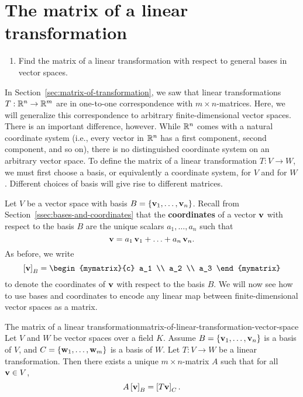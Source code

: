 \section{The matrix of a linear transformation}

\begin{outcome}
  \begin{enumerate}
  \item Find the matrix of a linear transformation with respect to
    general bases in vector spaces.
  \end{enumerate}
\end{outcome}

In Section~\ref{sec:matrix-of-transformation}, we saw that linear
transformations $T:\mathbb{R}^n\to\mathbb{R}^m$ are in one-to-one correspondence with
$m\times n$-matrices. Here, we will generalize this correspondence to
arbitrary finite-dimensional vector spaces. There is an important
difference, however. While $\mathbb{R}^n$ comes with a natural coordinate
system (i.e., every vector in $\mathbb{R}^n$ has a first component, second
component, and so on), there is no distinguished coordinate system on
an arbitrary vector space. To define the matrix of a linear
transformation $T:V\to W$, we must first choose a basis, or
equivalently a coordinate system, for $V$ and for $W$. Different
choices of basis will give rise to different matrices.

Let $V$ be a vector space with basis
$B=\set{\vect{v}_1,\ldots,\vect{v}_n}$. Recall from
Section~\ref{ssec:bases-and-coordinates} that the \textbf{coordinates}
of a vector $\vect{v}$ with respect to the basis $B$%
%
 are the unique scalars
$a_1,\ldots,a_n$ such that
\begin{equation*}
  \vect{v} = a_1\,\vect{v}_1 + \ldots + a_n\,\vect{v}_n.
\end{equation*}
As before, we write
\begin{equation*}
  \coord{\vect{v}}_B = \begin{mymatrix}{c} a_1 \\ a_2 \\ a_3 \end{mymatrix}
\end{equation*}
to denote the coordinates of $\vect{v}$ with respect to the basis $B$.
We will now see how to use bases and coordinates to encode any linear
map between finite-dimensional vector spaces as a matrix. 

\begin{proposition}{The matrix of a linear transformation}{matrix-of-linear-transformation-vector-space}
  Let $V$ and $W$ be vector spaces over a field $K$. Assume
  $B=\set{\vect{v}_1,\ldots,\vect{v}_n}$ is a basis of $V$, and
  $C=\set{\vect{w}_1,\ldots,\vect{w}_m}$ is a basis of $W$.
  Let $T:V\to W$ be a linear transformation. Then there exists a
  unique $m\times n$-matrix $A$ such that for all $\vect{v}\in V$,
  \begin{equation*}
    A\coord{\vect{v}}_B = \coord{T\vect{v}}_C.
  \end{equation*}
\end{proposition}

